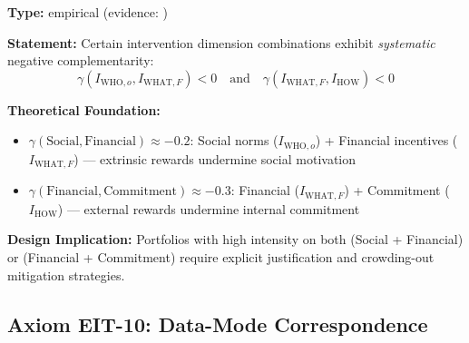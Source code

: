 \begin{tcolorbox}[colback=blue!5!white, colframe=blue!75!black,
    title=\textbf{Axiom EIT-9: Crowding-Out Constraint}]

\textbf{Type:} empirical (evidence: \citep{frey1997motivation, deci1971effects, gneezy2000pay})

\textbf{Statement:} Certain intervention dimension combinations exhibit \textit{systematic} negative complementarity:
\begin{equation}
\boxed{\gamma(I_{\text{WHO},o}, I_{\text{WHAT},F}) < 0 \quad \text{and} \quad \gamma(I_{\text{WHAT},F}, I_{\text{HOW}}) < 0}
\label{eq:ie-crowding-out}
\end{equation}

\textbf{Theoretical Foundation:}
\begin{itemize}[nosep]
    \item $\gamma(\text{Social}, \text{Financial}) \approx -0.2$: Social norms ($I_{\text{WHO},o}$) + Financial incentives ($I_{\text{WHAT},F}$) --- extrinsic rewards undermine social motivation \citep{frey1997motivation}
    \item $\gamma(\text{Financial}, \text{Commitment}) \approx -0.3$: Financial ($I_{\text{WHAT},F}$) + Commitment ($I_{\text{HOW}}$) --- external rewards undermine internal commitment \citep{deci1971effects}
\end{itemize}

\textbf{Design Implication:} Portfolios with high intensity on both (Social + Financial) or (Financial + Commitment) require explicit justification and crowding-out mitigation strategies.

\end{tcolorbox}

\subsection{Axiom EIT-10: Data-Mode Correspondence}

